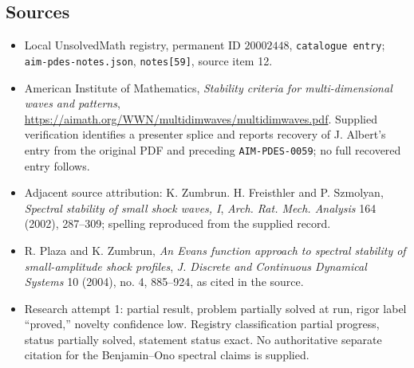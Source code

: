 \documentclass[11pt]{article}
\begin{document}
\subsection{Sources}
\begin{itemize}
\item Local UnsolvedMath registry, permanent ID $20002448$, \texttt{catalogue entry}; \texttt{aim-pdes-notes.json}, \texttt{notes[59]}, source item 12.
\item American Institute of Mathematics, \emph{Stability criteria for multi-dimensional waves and patterns}, \url{https://aimath.org/WWN/multidimwaves/multidimwaves.pdf}. Supplied verification identifies a presenter splice and reports recovery of J. Albert's entry from the original PDF and preceding \texttt{AIM-PDES-0059}; no full recovered entry follows.
\item Adjacent source attribution: K. Zumbrun. H. Freisthler and P. Szmolyan, \emph{Spectral stability of small shock waves, I}, \emph{Arch. Rat. Mech. Analysis} 164 (2002), 287--309; spelling reproduced from the supplied record.
\item R. Plaza and K. Zumbrun, \emph{An Evans function approach to spectral stability of small-amplitude shock profiles}, \emph{J. Discrete and Continuous Dynamical Systems} 10 (2004), no. 4, 885--924, as cited in the source.
\item Research attempt 1: partial result, problem partially solved at run, rigor label ``proved,'' novelty confidence low. Registry classification partial progress, status partially solved, statement status exact. No authoritative separate citation for the Benjamin--Ono spectral claims is supplied.
\end{itemize}
\end{document}
